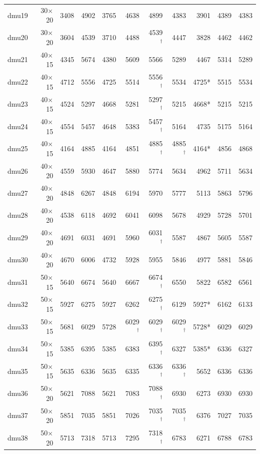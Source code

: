 {\begin{longtable}{lrrrrrrrrrr}
dmu19 & 30$\times$20 & 3408 & 4902 & 3765 & 4638 & 4899 & 4383 & 3901 & 4389 & 4383 \\
dmu20 & 30$\times$20 & 3604 & 4539 & 3710 & 4488 & 4539$^\dagger$ & 4447 & 3828 & 4462 & 4462 \\
dmu21 & 40$\times$15 & 4345 & 5674 & 4380 & 5609 & 5566 & 5289 & 4467 & 5314 & 5289 \\
dmu22 & 40$\times$15 & 4712 & 5556 & 4725 & 5514 & 5556$^\dagger$ & 5534 & 4725* & 5515 & 5534 \\
dmu23 & 40$\times$15 & 4524 & 5297 & 4668 & 5281 & 5297$^\dagger$ & 5215 & 4668* & 5215 & 5215 \\
dmu24 & 40$\times$15 & 4554 & 5457 & 4648 & 5383 & 5457$^\dagger$ & 5164 & 4735 & 5175 & 5164 \\
dmu25 & 40$\times$15 & 4164 & 4885 & 4164 & 4851 & 4885$^\dagger$ & 4885$^\dagger$ & 4164* & 4856 & 4868 \\
dmu26 & 40$\times$20 & 4559 & 5930 & 4647 & 5880 & 5774 & 5634 & 4962 & 5711 & 5634 \\
dmu27 & 40$\times$20 & 4848 & 6267 & 4848 & 6194 & 5970 & 5777 & 5113 & 5863 & 5796 \\
dmu28 & 40$\times$20 & 4538 & 6118 & 4692 & 6041 & 6098 & 5678 & 4929 & 5728 & 5701 \\
dmu29 & 40$\times$20 & 4691 & 6031 & 4691 & 5960 & 6031$^\dagger$ & 5587 & 4867 & 5605 & 5587 \\
dmu30 & 40$\times$20 & 4670 & 6006 & 4732 & 5928 & 5955 & 5846 & 4977 & 5881 & 5846 \\
dmu31 & 50$\times$15 & 5640 & 6674 & 5640 & 6667 & 6674$^\dagger$ & 6550 & 5822 & 6582 & 6561 \\
dmu32 & 50$\times$15 & 5927 & 6275 & 5927 & 6262 & 6275$^\dagger$ & 6129 & 5927* & 6162 & 6133 \\
dmu33 & 50$\times$15 & 5681 & 6029 & 5728 & 6029$^\dagger$ & 6029$^\dagger$ & 6029$^\dagger$ & 5728* & 6029 & 6029 \\
dmu34 & 50$\times$15 & 5385 & 6395 & 5385 & 6383 & 6395$^\dagger$ & 6327 & 5385* & 6336 & 6327 \\
dmu35 & 50$\times$15 & 5635 & 6336 & 5635 & 6335 & 6336$^\dagger$ & 6336$^\dagger$ & 5652 & 6336 & 6336 \\
dmu36 & 50$\times$20 & 5621 & 7088 & 5621 & 7083 & 7088$^\dagger$ & 6930 & 6273 & 6930 & 6930 \\
dmu37 & 50$\times$20 & 5851 & 7035 & 5851 & 7026 & 7035$^\dagger$ & 7035$^\dagger$ & 6376 & 7027 & 7035 \\
dmu38 & 50$\times$20 & 5713 & 7318 & 5713 & 7295 & 7318$^\dagger$ & 6783 & 6271 & 6788 & 6783 \\

\end{longtable}}
